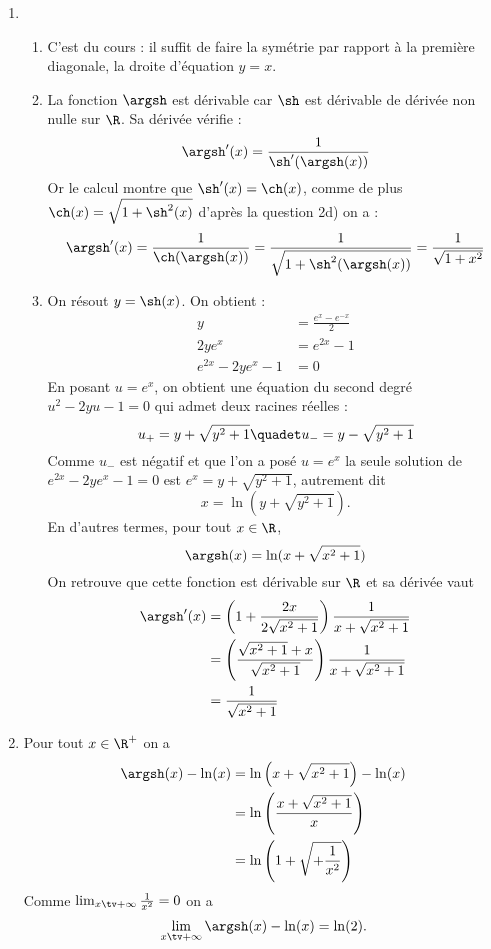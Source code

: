 \begin{correction}
\begin{enumerate}
\begin{enumerate}
\end{enumerate}
\item 
\begin{enumerate}
\item C'est du cours : il suffit de faire la symétrie par rapport à la première diagonale, la droite d'équation $y=x$. 
\item La fonction $\argsh$ est dérivable car $\sh$ est dérivable de dérivée non nulle sur $\R$. Sa dérivée vérifie  : 
$$\argsh'(x) = \frac{1}{\sh'(\argsh(x))}$$
Or le calcul montre que $\sh'(x) = \ch(x) $,  comme de plus $\ch (x)= \sqrt{1+\sh^2(x)}$ d'après la question 2d) on  a : 
$$\argsh'(x) = \frac{1}{\ch(\argsh(x))} = \frac{1 }{\sqrt{1+\sh^2(\argsh(x))}}= \frac{1}{\sqrt{1+x^2}}$$




\item On résout $y = \sh(x)$. On obtient : 
\begin{align*}
y &= \frac{e^{x}-e^{-x}}{2}\\
2ye^{x} &=e^{2x}-1\\
e^{2x}-2ye^{x}-1&=0
\end{align*}
En posant $u=e^{x}$, on obtient une équation du second degré  
$u^2 -2yu -1=0$ qui admet deux racines réelles : 
$$u_+ = y + \sqrt{y^2 +1}  \quadet  u_- = y - \sqrt{y^2 +1}$$
Comme $u_-$ est négatif et que l'on a posé $ u=e^x$ la seule solution de $
e^{2x}-2ye^{x}-1=0$ est $e^x =  y + \sqrt{y^2 +1}  $, autrement dit 
$$x= \ln( y +\sqrt{y^2+1}).$$
En d'autres termes, pour tout $x\in \R$,  $$\argsh(x) = \ln( x +\sqrt{x^2+1})$$
On retrouve que cette fonction est dérivable sur $\R$ et sa dérivée vaut 
\begin{align*}
\argsh'(x)  &= \left(1 + \frac{2x}{2\sqrt{x^2+1}} \right)\frac{1}{ x+\sqrt{x^2+1} }\\
&= \left( \frac{\sqrt{x^2+1}+x}{\sqrt{x^2+1}} \right)\frac{1}{ x+\sqrt{x^2+1} }\\
				&= \frac{1}{\sqrt{x^2+1}}
\end{align*}









\end{enumerate}
\item Pour tout $x\in \R^+$ on a 
\begin{align*}
\argsh(x)- \ln(x) &= \ln\left(x+\sqrt{x^2+1}\right) -\ln(x) \\
							&= \ln\left(\frac{x+\sqrt{x^2+1}}{x}\right)  \\
							&= \ln\left(1+\sqrt{+\frac{1}{x^2}}\right)  
\end{align*}
Comme $\lim_{x\tv+\infty} \frac{1}{x^2}=0$ on a 
$$\lim_{x\tv+\infty} \argsh(x)- \ln(x) =\ln(2).$$




\end{enumerate}
\end{correction}
